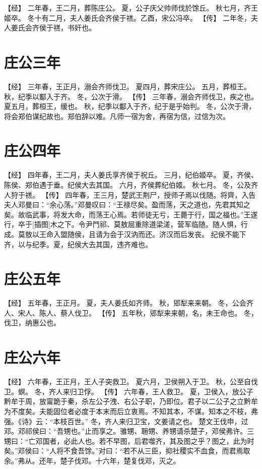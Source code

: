 \documentclass[a4paper,12pt,UTF8,twoside]{ctexbook}
\begin{document}
【经】
二年春，王二月，葬陈庄公。
夏，公子庆父帅师伐於馀丘。
秋七月，齐王姬卒。
冬十有二月，夫人姜氏会齐侯于禚。乙酉，宋公冯卒。
【传】
二年冬，夫人姜氏会齐侯于禚，书奸也。

\section{庄公三年}

【经】
三年春，王正月，溺会齐师伐卫。
夏四月，葬宋庄公。
五月，葬桓王。
秋，纪季以酅入于齐。
冬，公次于滑。
【传】
三年春，溺会齐师伐卫，疾之也。
夏五月，葬桓王，缓也。
秋，纪季以酅入于齐，纪于是乎始判。
冬，公次于滑，将会郑伯谋纪故也。郑伯辞以难。凡师一宿为舍，再宿为信，过信为次。

\section{庄公四年}

【经】
四年春，王二月，夫人姜氏享齐侯于祝丘。
三月，纪伯姬卒。
夏，齐侯、陈侯、郑伯遇于垂。纪侯大去其国。
六月，齐侯葬纪伯姬。
秋七月。
冬，公及齐人狩于禚。
【传】
四年春，王三月，楚武王荆尸，授师孑焉以伐随。将齊，入告夫人邓曼曰：“余心荡。”邓曼叹曰：“王禄尽矣。盈而荡，天之道也，先君其知之矣。故临武事，将发大命，而荡王心焉。若师徒无亏，王薨于行，国之福也。”王遂行，卒于[插图]木之下。令尹鬥祁、莫敖屈重除道梁溠，营军临随。随人惧，行成。莫敖以王命入盟随侯，且请为会于汉汭而还。济汉而后发丧。
纪侯不能下齐，以与纪季。夏，纪侯大去其国，违齐难也。

\section{庄公五年}

【经】
五年春，王正月。
夏，夫人姜氏如齐师。
秋，郳犁来来朝。
冬，公会齐人、宋人、陈人、蔡人伐卫。
【传】
五年秋，郳犁来来朝，名，未王命也。
冬，伐卫，纳惠公也。

\section{庄公六年}

【经】
六年春，王正月，王人子突救卫。
夏六月，卫侯朔入于卫。
秋，公至自伐卫。螟。
冬，齐人来归卫俘。
【传】
六年春，王人救卫。
夏，卫侯入，放公子黔牟于周，放甯跪于秦，杀左公子洩、右公子职，乃即位。君子以二公子之立黔牟为不度矣。夫能固位者必度于本末而后立衷焉。不知其本，不谋。知本之不枝，弗强。《诗》云：“本枝百世。”
冬，齐人来归卫宝，文姜请之也。
楚文王伐申，过邓。邓祁侯曰：“吾甥也。”止而享之。骓甥、耼甥、养甥请杀楚子，邓侯弗许。三甥曰：“亡邓国者，必此人也。若不早图，后君噬齐，其及图之乎？图之，此为时矣。”邓侯曰：“人将不食吾馀。”对曰：“若不从三臣，抑社稷实不血食，而君焉取余。”弗从。还年，楚子伐邓。十六年，楚复伐邓，灭之。
\end{document}
